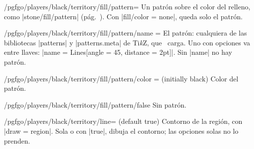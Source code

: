 	\begin{key}{/pgfgo/players/black/territory/fill/pattern=}
		Un patrón sobre el color del relleno, como |stone/fill/pattern| (pág.~\pageref{sec:piedras}). Con |fill/color = none|, queda solo el patrón.

		\begin{codeexample}[]
			\begin{goban}[5]
			\end{goban}
		\end{codeexample}
	\end{key}

	\begin{key}{/pgfgo/players/black/territory/fill/pattern/name = }
		El patrón: cualquiera de las bibliotecas |patterns| y |patterns.meta| de Ti\emph{k}Z, que \pgfgoname\ carga. Uno con opciones va entre llaves: |name = {Lines[angle = 45, distance = 2pt]}|. Sin |name| no hay patrón.
	\end{key}

	\begin{key}{/pgfgo/players/black/territory/fill/pattern/color =  (initially black)}
		Color del patrón.
	\end{key}

	\begin{key}{/pgfgo/players/black/territory/fill/pattern/false}
		Sin patrón.
	\end{key}

	\begin{key}{/pgfgo/players/black/territory/line= (default true)}
		Contorno de la región, con |draw = region|. Sola o con |true|, dibuja el contorno; las opciones solas no lo prenden.

		\begin{codeexample}[width=4.75cm]
			\begin{goban}[label = {at = {above, left}}]

			\end{goban}
		\end{codeexample}
	\end{key}


